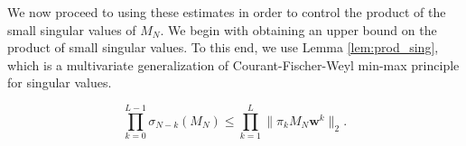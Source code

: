 \documentclass{amsart}
\numberwithin{equation}{section}
\def\corO{}
\def\corE{}
\def\corAB{}
\begin{document}
We now proceed to using these estimates in order to
control the product of the small singular values of $M_N$. \corAB{We begin with obtaining an upper bound on the product of small singular values. To this end,
  we use Lemma \ref{lem:prod_sing}, which is a multivariate generalization of Courant-Fischer-Weyl min-max principle for singular values.}

\begin{proposition}
  \begin{equation}
    \label{eq-fresh1}
  \prod_{k=0}^{\corAB{L}-1} \sigma_{N-k}(M_N) \leq
  \prod_{k=\corO{1}}^{\corAB{L}}
    \|\pi_{\corO{k}} M_N {\bm w}^{\corO{k}}\|_2.
  \end{equation}
  \label{prop:ub}
\end{proposition}
\end{document}

